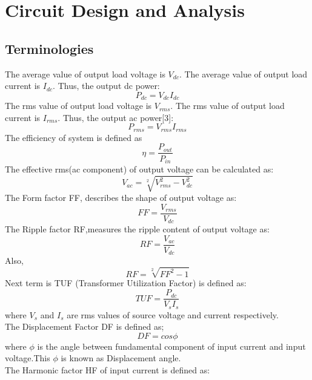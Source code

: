 \chapter{Circuit Design and Analysis} %
\label{Chapter3}
\section{Terminologies}
The average value of output load voltage is $V_{dc}$.
The average value of output load current is $I_{dc}$.
Thus, the output dc power:
$$P_{dc}=V_{dc}I_{dc}$$ 
The rms value of output load voltage is $V_{rms}$.
The rms value of output load current is $I_{rms}$.
Thus, the output ac power[3]:
\begin{equation}
P_{rms}=V_{rms}I_{rms}
\end{equation}
The efficiency of system is defined as
\begin{equation}
 \eta=\frac{P_{out}}{P_{in}}
\end{equation}
The effective rms(ac component) of output voltage can be calculated as:
\begin{equation}
V_{ac}=\sqrt[2]{V_{rms}^2-V_{dc}^2}
\end{equation}
The Form factor FF, describes the shape of output voltage as:
\begin{equation}
FF=\frac{V_{rms}}{V_{dc}}
\end{equation}
The Ripple factor RF,measures the ripple content of output voltage as:
\begin{equation}
RF=\frac{V_{ac}}{V_{dc}}
\end{equation}
Also,\\
\begin{equation}
RF=\sqrt[2]{FF^2-1}
\end{equation}
Next term is TUF (Transformer Utilization Factor) is defined as:
\begin{equation}
TUF=\frac{P_{dc}}{V_sI_s}
\end{equation}
where $V_s$ and $I_s$ are rms values of source voltage and current respectively.\\
The Displacement Factor DF is defined as;
\begin{equation}
DF=cos\phi
\end{equation}
where $\phi$ is the angle between fundamental component of input current and input voltage.This $\phi$ is known as Displacement angle.\\
The Harmonic factor HF of input current is defined as:
